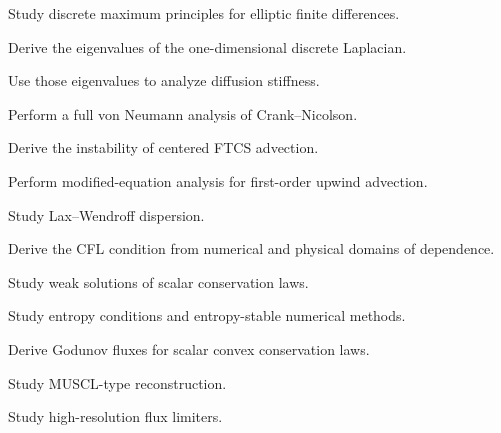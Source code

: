 \begin{exercise}[4]
Study discrete maximum principles for elliptic finite differences.
\end{exercise}

\begin{exercise}[4]
Derive the eigenvalues of the one-dimensional discrete Laplacian.
\end{exercise}

\begin{exercise}[4]
Use those eigenvalues to analyze diffusion stiffness.
\end{exercise}

\begin{exercise}[4]
Perform a full von Neumann analysis of Crank--Nicolson.
\end{exercise}

\begin{exercise}[4]
Derive the instability of centered FTCS advection.
\end{exercise}

\begin{exercise}[4]
Perform modified-equation analysis for first-order upwind advection.
\end{exercise}

\begin{exercise}[4]
Study Lax--Wendroff dispersion.
\end{exercise}

\begin{exercise}[4]
Derive the CFL condition from numerical and physical domains of dependence.
\end{exercise}

\begin{exercise}[4]
Study weak solutions of scalar conservation laws.
\end{exercise}

\begin{exercise}[4]
Study entropy conditions and entropy-stable numerical methods.
\end{exercise}

\begin{exercise}[4]
Derive Godunov fluxes for scalar convex conservation laws.
\end{exercise}

\begin{exercise}[4]
Study MUSCL-type reconstruction.
\end{exercise}

\begin{exercise}[4]
Study high-resolution flux limiters.
\end{exercise}

